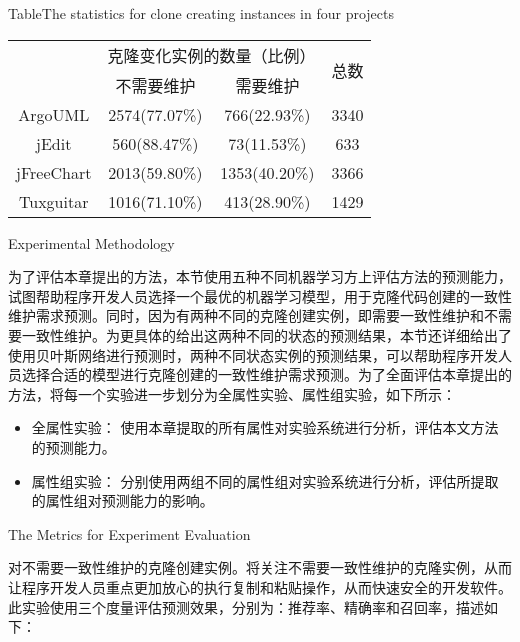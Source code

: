 \begin{table}[htbp]
{Table$\!$}{The statistics for clone creating instances in four projects}
\vspace{0.5em}
\centering
\wuhao
\begin{tabular}{cccc}
\toprule[1.5pt]
~\multirow{2}{*}{实验系统}& \multicolumn{2}{c}{克隆变化实例的数量（比例）} & \multirow{2}{*}{总数}\\ 
 \cline{2-3}
~&{不需要维护} &{需要维护} & ~\\
\midrule[1pt]
ArgoUML&	2574(77.07\%)&	766(22.93\%)&	3340\\
jEdit&	560(88.47\%)&	73(11.53\%)&	633\\
jFreeChart&	2013(59.80\%)&	1353(40.20\%)&	3366\\
Tuxguitar&	1016(71.10\%)&	413(28.90\%)&	1429\\
\bottomrule[1.5pt]
\end{tabular}
\end{table}

{Experimental Methodology}

为了评估本章提出的方法，本节使用五种不同机器学习方上评估方法的预测能力，试图帮助程序开发人员选择一个最优的机器学习模型，用于克隆代码创建的一致性维护需求预测。同时，因为有两种不同的克隆创建实例，即需要一致性维护和不需要一致性维护。为更具体的给出这两种不同的状态的预测结果，本节还详细给出了使用贝叶斯网络进行预测时，两种不同状态实例的预测结果，可以帮助程序开发人员选择合适的模型进行克隆创建的一致性维护需求预测。为了全面评估本章提出的方法，将每一个实验进一步划分为全属性实验、属性组实验，如下所示：

\begin{itemize}
\item
全属性实验：
使用本章提取的所有属性对实验系统进行分析，评估本文方法的预测能力。
\item
属性组实验：
分别使用两组不同的属性组对实验系统进行分析，评估所提取的属性组对预测能力的影响。
\end{itemize}

{The Metrics for Experiment Evaluation}
\label{ref-creatingmetrics}

对不需要一致性维护的克隆创建实例。将关注不需要一致性维护的克隆实例，从而让程序开发人员重点更加放心的执行复制和粘贴操作，从而快速安全的开发软件。此实验使用三个度量评估预测效果，分别为：推荐率、精确率和召回率，描述如下：

